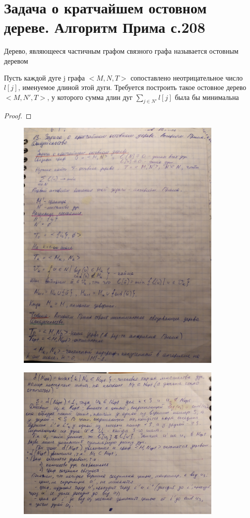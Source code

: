 \documentclass[discrete.tex]{subfiles}
\begin{document}
  \section{Задача о кратчайшем остовном дереве. Алгоритм Прима с.208}
  \begin{definition}
    Дерево, являющееся частичным графом связного графа называется остовным деревом
  \end{definition}

  \begin{task}
    Пусть каждой дуге j графа $<M,N,T>$ сопоставлено неотрицательное число $l[j]$, именуемое длиной этой дуги. Требуется построить такое остовное дерево $<M,N',T>$, у которого сумма длин дуг $\sum_{j \in N'} l[j]$ была бы минимальна
  \end{task}

  \begin{alg}[Прима]

  \end{alg}

  \begin{theorem}

  \end{theorem}

  \begin{proof}

  \end{proof}
  \begin{figure}[H]
          \includegraphics[width=10cm]{pics/43_1}
          \centering
  \end{figure}
  \begin{figure}[H]
          \includegraphics[width=10cm]{pics/43_2}
          \centering
  \end{figure}
\end{document}
